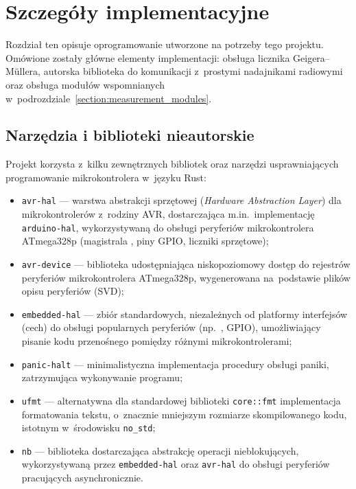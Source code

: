 \chapter{Szczegóły implementacyjne}
Rozdział ten opisuje oprogramowanie utworzone na potrzeby tego projektu.
Omówione zostały główne elementy implementacji: obsługa licznika 
Geigera--Müllera, autorska biblioteka do komunikacji z~prostymi nadajnikami 
radiowymi oraz obsługa modułów wspomnianych 
w~podrozdziale~\ref{section:measurement_modules}.

\section{Narzędzia i biblioteki nieautorskie}
Projekt korzysta z~kilku zewnętrznych bibliotek oraz narzędzi 
usprawniających programowanie mikrokontrolera w~języku Rust:

\begin{itemize}
    \item \texttt{avr-hal} --- warstwa abstrakcji sprzętowej
    (\textit{Hardware Abstraction Layer}) dla mikrokontrolerów z~rodziny AVR,
    dostarczająca m.in.~implementację \texttt{arduino-hal}, wykorzystywaną
    do obsługi peryferiów mikrokontrolera ATmega328p (magistrala \isqrc, piny GPIO,
    liczniki sprzętowe);

    \item \texttt{avr-device} --- biblioteka udostępniająca niskopoziomowy
    dostęp do rejestrów peryferiów mikrokontrolera ATmega328p, wygenerowana
    na~podstawie plików opisu peryferiów (SVD);

    \item \texttt{embedded-hal} --- zbiór standardowych, niezależnych od
    platformy interfejsów (cech) do obsługi popularnych peryferiów
    (np.~\isqrc, GPIO), umożliwiający pisanie kodu przenośnego pomiędzy
    różnymi mikrokontrolerami;

    \item \texttt{panic-halt} --- minimalistyczna implementacja procedury
    obsługi paniki, zatrzymująca wykonywanie programu;

    \item \texttt{ufmt} --- alternatywna dla standardowej biblioteki
    \texttt{core::fmt} implementacja formatowania tekstu, o~znacznie
    mniejszym rozmiarze skompilowanego kodu, istotnym w~środowisku
    \texttt{no\_std};

    \item \texttt{nb} --- biblioteka dostarczająca abstrakcję operacji
    nieblokujących, wykorzystywaną przez \texttt{embedded-hal} oraz
    \texttt{avr-hal} do obsługi peryferiów pracujących asynchronicznie.
\end{itemize}

